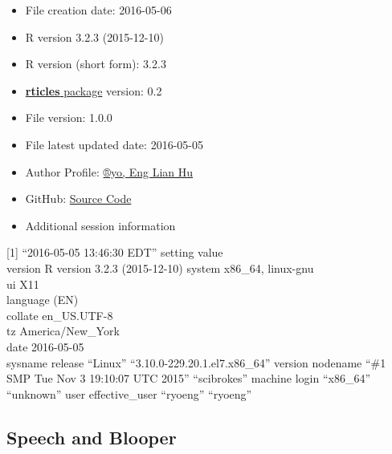 \documentclass[article]{jss}
\providecommand{\tightlist}{%
  \setlength{\itemsep}{0pt}\setlength{\parskip}{0pt}}
\begin{document}
\begin{itemize}
\tightlist
\item
  File creation date: 2016-05-06
\item
  R version 3.2.3 (2015-12-10)
\item
  R version (short form): 3.2.3
\item
  \href{https://github.com/rstudio/rticles}{\textbf{rticles} package}
  version: 0.2
\item
  File version: 1.0.0
\item
  File latest updated date: 2016-05-05
\item
  Author Profile:
  \href{https://beta.rstudioconnect.com/englianhu/ryo-eng/}{®yo, Eng
  Lian Hu}
\item
  GitHub:
  \href{https://github.com/scibrokes/odds-modelling-and-testing-inefficiency-of-sports-bookmakers}{Source
  Code}
\item
  Additional session information
\end{itemize}

{[}1{]} ``2016-05-05 13:46:30 EDT'' setting value\\
 version R version 3.2.3 (2015-12-10) system x86\_64, linux-gnu\\
 ui X11\\
 language (EN)\\
 collate en\_US.UTF-8\\
 tz America/New\_York\\
 date 2016-05-05\\
 sysname release ``Linux'' ``3.10.0-229.20.1.el7.x86\_64'' version
nodename ``\#1 SMP Tue Nov 3 19:10:07 UTC 2015'' ``scibrokes'' machine
login ``x86\_64'' ``unknown'' user effective\_user ``ryoeng'' ``ryoeng''

\subsection{Speech and Blooper}\label{speech-and-blooper}
\end{document}
